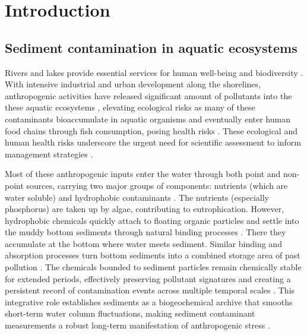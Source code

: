 \section{Introduction}


\subsection{Sediment contamination in aquatic ecosystems}

Rivers and lakes provide essential services for human well-being and biodiversity \cite{Vörösmarty2010GlobalThreats}.
With intensive industrial and urban development along the shorelines, anthropogenic activities have released 
significant amount of pollutants into the these aquatic ecosystems \cite{DavidAllan2013},
elevating ecological risks as many of these contaminants bioaccumulate in aquatic organisms and eventually enter human 
food chains through fish consumption, posing health risks \cite{Eggleton2004SedDisturbance, USGS_SedimentAssociatedContaminants_2019}.
These ecological and human health risks underscore the urgent need for scientific assessment to inform management strategies \cite{Niemi2004EcologicalIndicators}.

Most of these anthropogenic inputs enter the water through 
both point and non-point sources, carrying two major groups of components: 
nutrients (which are water soluble) and hydrophobic contaminants \cite{Carpenter1998Nonpoint}.
The nutrients (especially phosphorus) are taken up by algae, contributing to eutrophication.
However, hydrophobic chemicals
quickly attach to floating organic particles and settle into the muddy bottom sediments through natural binding processes \cite{DavidAllan2013}.
There they accumulate at the bottom where water meets sediment.
Similar binding and absorption processes turn bottom sediments into
a combined storage area of past pollution \cite{Eggleton2004SedDisturbance, USGS_SedimentAssociatedContaminants_2019, ChiaiaHernandez2022,Burton2002SedQuality}.
The chemicals bounded to sediment particles remain chemically stable for extended periods, effectively preserving pollutant signatures 
and creating a persistent record of contamination events across multiple temporal scales \cite{ChiaiaHernandez2022, Burton2002SedQuality}.
This integrative role establishes sediments as a biogeochemical archive that smooths short-term water column fluctuations,
making sediment contaminant measurements a robust long-term {manifestation} of anthropogenic stress \cite{Karickhoff1984Sorption}.


